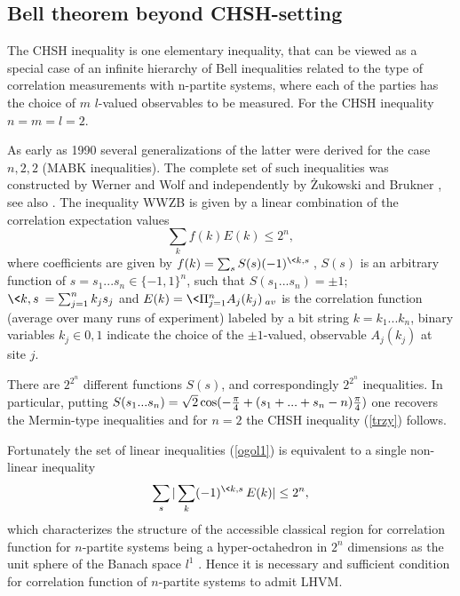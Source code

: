 \documentclass[rmp,12pt,preprint]{revtex4-2}
\begin{document}
\subsection {Bell theorem beyond CHSH-setting}

The CHSH inequality is one elementary inequality, that can be viewed
as a special case of an infinite hierarchy of Bell inequalities
related to the type of correlation measurements with n-partite
systems, where each of the parties has the choice of $m$ $l$-valued
observables to be measured. For the CHSH inequality $n=m=l=2$.

As early as 1990 several generalizations of the latter were derived
for the case $n,2,2$ (MABK inequalities). The complete set of
such inequalities was constructed by Werner and Wolf \cite {Wolf} and
independently by \.Zukowski and Brukner \cite{ZB}, see also
\cite{WeinfurterZ_4fotent2001}. The inequality WWZB is given by a
linear combination of the correlation expectation values
\begin{equation}
  \sum_k f(k)E(k)\leq 2^n, \label{ogol1}
\end{equation}
where coefficients are given by $f(k)=\sum_{s} S(s)(-1)^{\<k,s\>}$,
$S(s)$ is an arbitrary function of $s=s_1...s_n\in \{-1,1\}^n$, such
that $S(s_1...s_n)=\pm 1$; $\<k,s\> = \sum^n_{j=1}{k_js_j}$ and
$E(k)=\<\Pi ^n_{j=1}A_j(k_j)\>_{av}$ is the correlation function
(average over many runs of experiment) labeled by a bit string
$k=k_1...k_n$, binary variables $k_j\in {0,1}$ indicate the choice of
the $\pm 1$-valued, observable $A_j(k_j)$ at site $j$.

There are $2^{2^n}$ different functions $S(s)$, and correspondingly
$2^{2^n}$ inequalities. In particular, putting $S(s_1...s_n)= \sqrt2 \cos
(-{\pi  \over4}+(s_1+...+s_n-n){\pi  \over4})$ one recovers the
Mermin-type inequalities and for $n=2$ the CHSH inequality
(\ref{trzy}) follows.

Fortunately the set of linear inequalities (\ref{ogol1}) is equivalent
to a single non-linear inequality
\begin{equation}
\sum_s|\sum_k(-1)^{\<k,s\>}E(k)|\leq 2^n, \label{ogol2}
\end{equation}
which characterizes the structure of the accessible classical region
for correlation function for $n$-partite systems being a
hyper-octahedron in $2^n$ dimensions as the unit sphere of the Banach
space $l^1$ \cite {Wolf}. Hence it is necessary and sufficient
condition for correlation function of $n$-partite systems to admit
LHVM.
\end{document}
